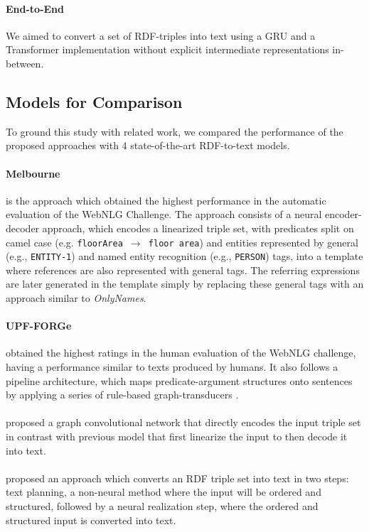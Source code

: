 \documentclass[11pt,a4paper]{article}
\begin{document}
\paragraph{End-to-End} We aimed to convert a set of RDF-triples into text using a GRU and a Transformer implementation without explicit intermediate representations in-between.

\subsection{Models for Comparison}

To ground this study with related work, we compared the performance of the proposed approaches with 4 state-of-the-art RDF-to-text models.

\paragraph{Melbourne} is the approach which obtained the highest performance in the automatic evaluation of the WebNLG Challenge. The approach consists of a neural encoder-decoder approach, which encodes a linearized triple set, with predicates split on camel case (e.g. \texttt{floorArea $\rightarrow$ floor area}) and entities represented by general (e.g., \texttt{ENTITY-1}) and named entity recognition (e.g., \texttt{PERSON}) tags, into a template where references are also represented with general tags. The referring expressions are later generated in the template simply by replacing these general tags with an approach similar to \textit{OnlyNames}.

\paragraph{UPF-FORGe} obtained the highest ratings in the human evaluation of the WebNLG challenge, having a performance similar to texts produced by humans. It also follows a pipeline architecture, which maps predicate-argument structures onto sentences by applying a series of rule-based graph-transducers \cite{mille2019}.

\paragraph{} proposed a graph convolutional network that directly encodes the input triple set in contrast with previous model that first linearize the input to then decode it into text. 

\paragraph{} proposed an approach which converts an RDF triple set into text in two steps: text planning, a non-neural method where the input will be ordered and structured, followed by a neural realization step, where the ordered and structured input is converted into text. 
\end{document}
